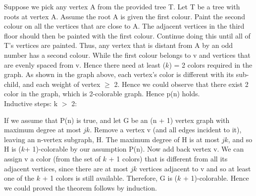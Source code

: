 \documentclass{article}
\begin{document}
\noindent Suppose we pick any vertex A from the provided tree T. Let T be a tree with roots at vertex A. Assume the root A is given the first colour. Paint the second colour on all the vertices that are close to A. The adjacent vertices in the third floor should then be painted with the first colour. Continue doing this until all of T's vertices are painted. Thus, any vertex that is distant from A by an odd number has a second colour. While the first colour belongs to v and vertices that are evenly spaced from v. Hence there need at least ($k$) = 2 colors required in the graph. As shown in the graph above, each vertex's color is different with its sub-child, and each weight of vertex $\geq$ 2. Hence we could observe that there exist 2 color in the graph, which is 2-colorable graph. Hence p(n) holds.\\

\noindent Inductive steps: k $>$ 2:

\noindent If we assume that P(n) is true, and let G be an (n + 1) vertex graph with maximum degree at most $jk$. Remove a vertex v (and all edges incident to it), leaving an n-vertex subgraph, H. The maximum degree of H is at most $jk$, and so H is ($k$+ 1)-colorable by our assumption P(n). Now add back vertex v. We can assign v a color (from the set of $k$ + 1 colors) that is different from all its adjacent vertices, since there are at most $jk$ vertices adjacent to v and so at least one of the $k$ + 1 colors is still available. Therefore, G is ($k$ + 1)-colorable. Hence we could proved the theorem follows by induction.\\
\end{document}

